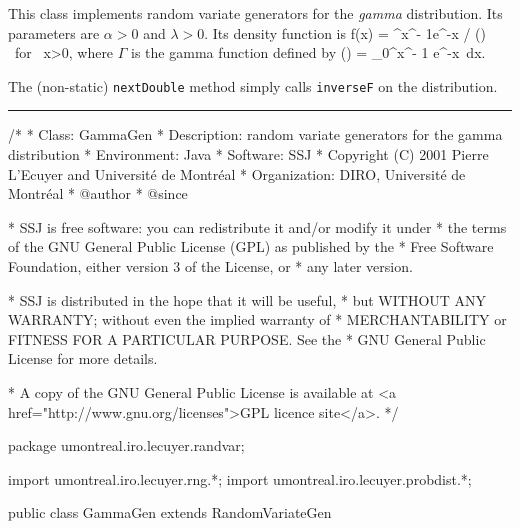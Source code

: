 
This class implements random variate generators for the {\em gamma\/} 
distribution. Its parameters are $\alpha>0$ and $\lambda>0$. 
Its density function is
\eq
  f(x) = \lambda^\alpha x^{\alpha - 1}e^{-\lambda x} / \Gamma(\alpha)
      \qquad\mbox{ for } x>0,          
\endeq
where $\Gamma$ is the gamma function defined by
\eq
   \Gamma (\alpha) = \int_0^\infty x^{\alpha - 1} e^{-x}\ dx.
\endeq

The (non-static) \texttt{nextDouble} method simply calls \texttt{inverseF} on the
distribution. 


\bigskip\hrule

\begin{code}
\begin{hide}
/*
 * Class:        GammaGen
 * Description:  random variate generators for the gamma distribution
 * Environment:  Java
 * Software:     SSJ 
 * Copyright (C) 2001  Pierre L'Ecuyer and Université de Montréal
 * Organization: DIRO, Université de Montréal
 * @author       
 * @since

 * SSJ is free software: you can redistribute it and/or modify it under
 * the terms of the GNU General Public License (GPL) as published by the
 * Free Software Foundation, either version 3 of the License, or
 * any later version.

 * SSJ is distributed in the hope that it will be useful,
 * but WITHOUT ANY WARRANTY; without even the implied warranty of
 * MERCHANTABILITY or FITNESS FOR A PARTICULAR PURPOSE.  See the
 * GNU General Public License for more details.

 * A copy of the GNU General Public License is available at
   <a href="http://www.gnu.org/licenses">GPL licence site</a>.
 */
\end{hide}
package umontreal.iro.lecuyer.randvar;\begin{hide}
import umontreal.iro.lecuyer.rng.*;
import umontreal.iro.lecuyer.probdist.*;
\end{hide}

public class GammaGen extends RandomVariateGen \begin{hide} {
   protected double alpha = -1.0;
   protected double lambda = -1.0;

\end{hide}
\end{code}

